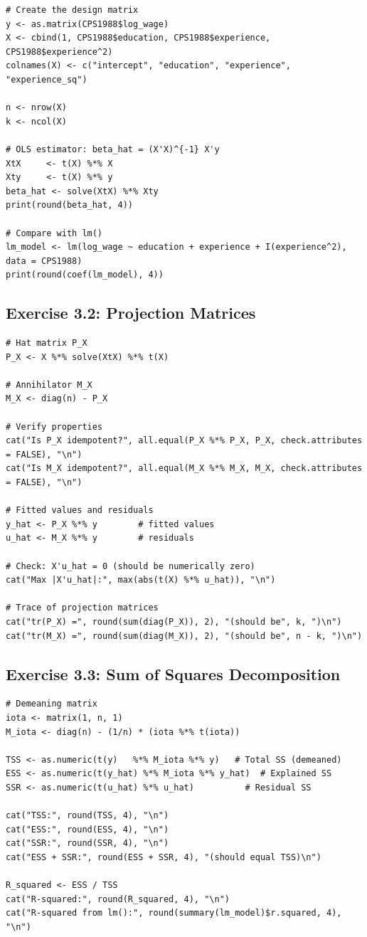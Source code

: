 \begin{lstlisting}
# Create the design matrix
y <- as.matrix(CPS1988$log_wage)
X <- cbind(1, CPS1988$education, CPS1988$experience, CPS1988$experience^2)
colnames(X) <- c("intercept", "education", "experience", "experience_sq")

n <- nrow(X)
k <- ncol(X)

# OLS estimator: beta_hat = (X'X)^{-1} X'y
XtX     <- t(X) %*% X
Xty     <- t(X) %*% y
beta_hat <- solve(XtX) %*% Xty
print(round(beta_hat, 4))

# Compare with lm()
lm_model <- lm(log_wage ~ education + experience + I(experience^2), data = CPS1988)
print(round(coef(lm_model), 4))
\end{lstlisting}

\subsection{Exercise 3.2: Projection Matrices}

\begin{lstlisting}
# Hat matrix P_X
P_X <- X %*% solve(XtX) %*% t(X)

# Annihilator M_X
M_X <- diag(n) - P_X

# Verify properties
cat("Is P_X idempotent?", all.equal(P_X %*% P_X, P_X, check.attributes = FALSE), "\n")
cat("Is M_X idempotent?", all.equal(M_X %*% M_X, M_X, check.attributes = FALSE), "\n")

# Fitted values and residuals
y_hat <- P_X %*% y        # fitted values
u_hat <- M_X %*% y        # residuals

# Check: X'u_hat = 0 (should be numerically zero)
cat("Max |X'u_hat|:", max(abs(t(X) %*% u_hat)), "\n")

# Trace of projection matrices
cat("tr(P_X) =", round(sum(diag(P_X)), 2), "(should be", k, ")\n")
cat("tr(M_X) =", round(sum(diag(M_X)), 2), "(should be", n - k, ")\n")
\end{lstlisting}

\subsection{Exercise 3.3: Sum of Squares Decomposition}

\begin{lstlisting}
# Demeaning matrix
iota <- matrix(1, n, 1)
M_iota <- diag(n) - (1/n) * (iota %*% t(iota))

TSS <- as.numeric(t(y)   %*% M_iota %*% y)   # Total SS (demeaned)
ESS <- as.numeric(t(y_hat) %*% M_iota %*% y_hat)  # Explained SS
SSR <- as.numeric(t(u_hat) %*% u_hat)          # Residual SS

cat("TSS:", round(TSS, 4), "\n")
cat("ESS:", round(ESS, 4), "\n")
cat("SSR:", round(SSR, 4), "\n")
cat("ESS + SSR:", round(ESS + SSR, 4), "(should equal TSS)\n")

R_squared <- ESS / TSS
cat("R-squared:", round(R_squared, 4), "\n")
cat("R-squared from lm():", round(summary(lm_model)$r.squared, 4), "\n")
\end{lstlisting}

